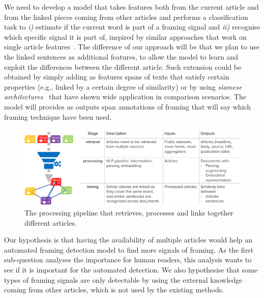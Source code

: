 We need to develop a model that takes features both from the current article and from the linked pieces coming from other articles and performs a classification task to \textit{i)} estimate if the current word is part of a framing signal and \textit{ii)} recognise which specific signal it is part of, inspired by similar approaches that work on single article features~\cite{da2019fine}.
The difference of our approach will be that we plan to use the linked sentences as additional features, to allow the model to learn and exploit the differences between the different article.
Such extension could be obtained by simply adding as features spans of texts that satisfy certain properties (e.g., linked by a certain degree of similarity) or by using \emph{siamese architectures}~\cite{bromley1994signature} that have shown wide application in comparison scenarios.
The model will provides as outputs span annotations of framing that will say which framing technique have been used.

\begin{figure}[!htb]
    \centering
    \includegraphics[width=\textwidth]{figures/figure_pipeline.pdf}
    \caption{The processing pipeline that retrieves, processes and links together different articles.}
    \label{fig:pipeline}
\end{figure}

Our hypothesis is that having the availability of multiple articles would help an automated framing detection model to find more signals of framing.
As the first sub-question analyses the importance for human readers, this analysis wants to see if it is important for the automated detection.
We also hypothesise that some types of framing signals are only detectable by using the external knowledge coming from other articles, which is not used by the existing methods.

